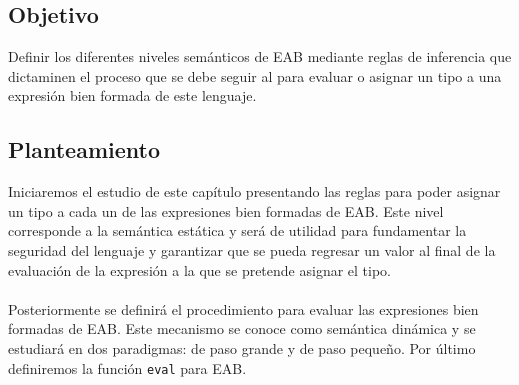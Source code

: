     \subsection*{Objetivo}
        Definir los diferentes niveles semánticos de \textsf{EAB} mediante reglas de inferencia que dictaminen el proceso que se 
        debe seguir al para evaluar o asignar un tipo a una expresión bien formada de este lenguaje.

    \subsection*{Planteamiento}
        Iniciaremos el estudio de este capítulo presentando las reglas para poder asignar un tipo a cada un de las expresiones bien formadas de \textsf{EAB}. Este nivel corresponde a la semántica estática y será de utilidad para fundamentar la seguridad del lenguaje y garantizar que se pueda regresar un valor al final de la evaluación de la expresión a la que se pretende asignar el tipo.\\\\
        Posteriormente se definirá el procedimiento para evaluar las expresiones bien formadas de \textsf{EAB}. Este mecanismo se conoce como semántica dinámica y se estudiará en dos paradigmas: de paso grande y de paso pequeño. Por último definiremos la función \texttt{eval} para \textsf{EAB}.

